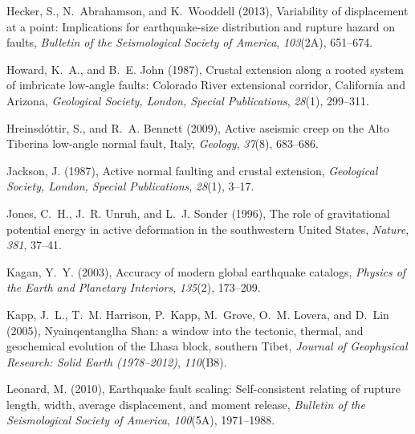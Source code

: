 \documentclass[draft,grl]{AGUTeX}
\begin{document}
\begin{article}
\begin{thebibliography}{46}
Hecker, S., N.~Abrahamson, and K.~Wooddell (2013), Variability of displacement
  at a point: Implications for earthquake-size distribution and rupture hazard
  on faults, \textit{Bulletin of the Seismological Society of America},
  \textit{103}(2A), 651--674.

Howard, K.~A., and B.~E. John (1987), Crustal extension along a rooted system
  of imbricate low-angle faults: {Colorado River} extensional corridor,
  {California} and {Arizona}, \textit{Geological Society, London, Special
  Publications}, \textit{28}(1), 299--311.

Hreinsd{\'o}ttir, S., and R.~A. Bennett (2009), Active aseismic creep on the
  {Alto Tiberina} low-angle normal fault, {I}taly, \textit{Geology},
  \textit{37}(8), 683--686.

Jackson, J. (1987), Active normal faulting and crustal extension,
  \textit{Geological Society, London, Special Publications}, \textit{28}(1),
  3--17.

Jones, C.~H., J.~R. Unruh, and L.~J. Sonder (1996), The role of gravitational
  potential energy in active deformation in the southwestern {U}nited {S}tates,
  \textit{Nature}, \textit{381}, 37--41.

Kagan, Y.~Y. (2003), Accuracy of modern global earthquake catalogs,
  \textit{Physics of the Earth and Planetary Interiors}, \textit{135}(2),
  173--209.

Kapp, J.~L., T.~M. Harrison, P.~Kapp, M.~Grove, O.~M. Lovera, and D.~Lin
  (2005), Nyainqentanglha {S}han: a window into the tectonic, thermal, and
  geochemical evolution of the {L}hasa block, southern {T}ibet, \textit{Journal
  of Geophysical Research: Solid Earth (1978--2012)}, \textit{110}(B8).

Leonard, M. (2010), Earthquake fault scaling: {S}elf-consistent relating of
  rupture length, width, average displacement, and moment release,
  \textit{Bulletin of the Seismological Society of America}, \textit{100}(5A),
  1971--1988.


\end{thebibliography}
\end{article}
\end{document}
